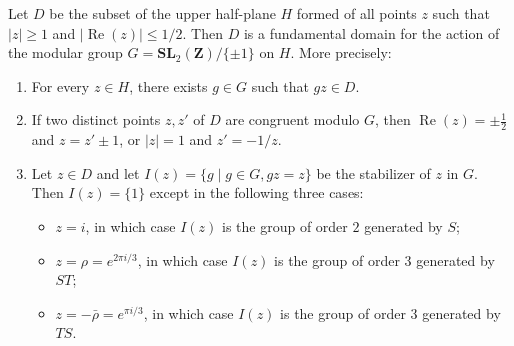 Let $D$ be the subset of the upper half-plane $H$ formed of all points $z$ such that $|z| \geq 1$ and $|\operatorname{Re}(z)| \leq 1/2$. Then $D$ is a fundamental domain for the action of the modular group $G = \mathbf{SL}_2(\mathbf{Z}) / \{\pm 1\}$ on $H$. More precisely:

\begin{enumerate}
\item[(1)] For every $z \in H$, there exists $g \in G$ such that $gz \in D$.
\item[(2)] If two distinct points $z, z'$ of $D$ are congruent modulo $G$, then $\operatorname{Re}(z) = \pm \frac{1}{2}$ and $z = z' \pm 1$, or $|z| = 1$ and $z' = -1/z$.
\item[(3)] Let $z \in D$ and let $I(z) = \{g \mid g \in G, gz = z\}$ be the stabilizer of $z$ in $G$. Then $I(z) = \{1\}$ except in the following three cases:
\begin{itemize}
\item $z = i$, in which case $I(z)$ is the group of order $2$ generated by $S$;
\item $z = \rho = e^{2\pi i/3}$, in which case $I(z)$ is the group of order $3$ generated by $ST$;
\item $z = -\bar{\rho} = e^{\pi i/3}$, in which case $I(z)$ is the group of order $3$ generated by $TS$.
\end{itemize}
\end{enumerate}
